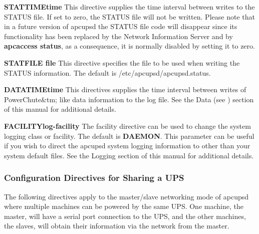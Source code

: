 {{{{{{{{{{{\label{index-Directives-Logging-245}
\label{index-Logging_002c-directives-246}

\begin{description}

\item {\bf STATTIME\lt{}time\gt{}}
This directive supplies the time interval between writes to the STATUS file.
If set to zero, the STATUS file will not be written. Please note that in a
future version of apcupsd the STATUS file code will disappear since its
functionality has been replaced by the Network Information Server and by {\bf
apcaccess status}, as a consequence, it is normally disabled by setting it to
zero.  

\item {\bf STATFILE \lt{}file\gt{}}
This directive specifies the file to be used when writing the STATUS
information. The default is /etc/apcupsd/apcupsd.status.  

\item {\bf DATATIME\lt{}time\gt{}}
This directives supplies the time interval between writes of PowerChute\&tm;
like data information to the log file. See the Data (see 
) section of this manual for
additional details.  

\item {\bf FACILITY\lt{}log-facility\gt{}}
The facility directive can be used to change the system logging class or
facility. The default is {\bf DAEMON}. This parameter can be useful if you
wish to direct the apcupsd system logging information to other than your
system default files. See the Logging section of this manual for additional
details. 
\end{description}

\label{Configuration-Directives-for-Sharing-a-UPS}

\subsubsection*{Configuration Directives for Sharing a UPS}

\label{index-Directives-Sharing-247}
The following directives apply to the master/slave networking mode of apcupsd
where multiple machines can be powered by the same UPS. One machine, the
master, will have a serial port connection to the UPS, and the other machines,
the slaves, will obtain their information via the network from the master.  

}}}}}}}}}}}
